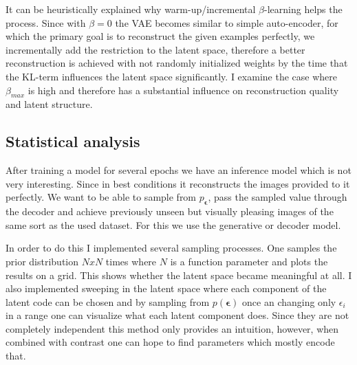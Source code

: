 \documentclass[12pt, english]{article}
\begin{document}
\vspace{4mm}

\par It can be heuristically explained why warm-up/incremental $\beta$-learning helps the process. Since with $\beta = 0$ the VAE becomes similar to simple auto-encoder, for which the primary goal is to reconstruct the given examples perfectly, we incrementally add the restriction to the latent space, therefore a better reconstruction is achieved with not randomly initialized weights by the time that the KL-term influences the latent space significantly. I examine the case where $\beta_{max}$ is high and therefore has a substantial influence on reconstruction quality and latent structure.

\vspace{5mm}

\subsection{Statistical analysis}

\vspace{5mm}

\par After training a model for several epochs we have an inference model which is not very interesting. Since in best conditions it reconstructs the images provided to it perfectly. We want to be able to sample from $p_{\bm{\epsilon}}$, pass the sampled value through the decoder and achieve previously unseen but visually pleasing images of the same sort as the used dataset. For this we use the generative or decoder model. 

\vspace{4mm}

\par In order to do this I implemented several sampling processes. One samples the prior distribution $N x N$ times where $N$ is a function parameter and plots the results on a grid. This shows whether the latent space became meaningful at all. I also implemented sweeping in the latent space where each component of the latent code can be chosen and by sampling from $p(\bm{\epsilon})$ once an changing only $\epsilon_{i}$ in a range one can visualize what each latent component does. Since they are not completely independent this method only provides an intuition, however, when combined with contrast one can hope to find parameters which mostly encode that.

\vspace{4mm}
\end{document}
